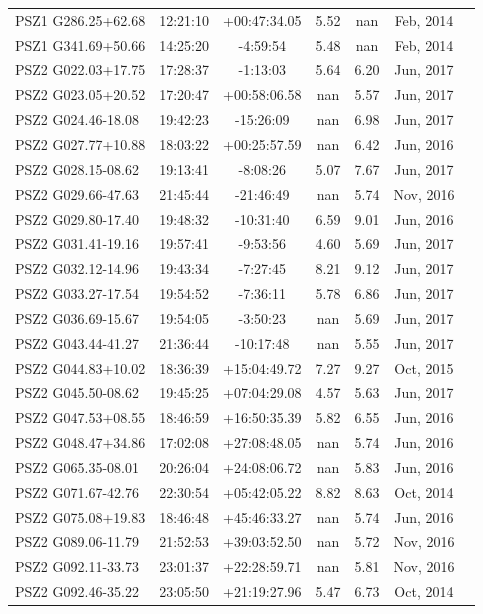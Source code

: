 \documentclass[apj, revtex4]{emulateapj}
\begin{document}
\begin{longtable*}{lcccccc}
PSZ1 G286.25+62.68 & 12:21:10 & +00:47:34.05 & 5.52 & nan & Feb, 2014\\
PSZ1 G341.69+50.66 & 14:25:20 & -4:59:54 & 5.48 & nan & Feb, 2014\\
PSZ2 G022.03+17.75 & 17:28:37 & -1:13:03 & 5.64 & 6.20 & Jun, 2017\\
PSZ2 G023.05+20.52 & 17:20:47 & +00:58:06.58 & nan & 5.57 & Jun, 2017\\
PSZ2 G024.46-18.08 & 19:42:23 & -15:26:09 & nan & 6.98 & Jun, 2017\\
PSZ2 G027.77+10.88 & 18:03:22 & +00:25:57.59 & nan & 6.42 & Jun, 2016\\
PSZ2 G028.15-08.62 & 19:13:41 & -8:08:26 & 5.07 & 7.67 & Jun, 2017\\
PSZ2 G029.66-47.63 & 21:45:44 & -21:46:49 & nan & 5.74 & Nov, 2016\\
PSZ2 G029.80-17.40 & 19:48:32 & -10:31:40 & 6.59 & 9.01 & Jun, 2016\\
PSZ2 G031.41-19.16 & 19:57:41 & -9:53:56 & 4.60 & 5.69 & Jun, 2017\\
PSZ2 G032.12-14.96 & 19:43:34 & -7:27:45 & 8.21 & 9.12 & Jun, 2017\\
PSZ2 G033.27-17.54 & 19:54:52 & -7:36:11 & 5.78 & 6.86 & Jun, 2017\\
PSZ2 G036.69-15.67 & 19:54:05 & -3:50:23 & nan & 5.69 & Jun, 2017\\
PSZ2 G043.44-41.27 & 21:36:44 & -10:17:48 & nan & 5.55 & Jun, 2017\\
PSZ2 G044.83+10.02 & 18:36:39 & +15:04:49.72 & 7.27 & 9.27 & Oct, 2015\\
PSZ2 G045.50-08.62 & 19:45:25 & +07:04:29.08 & 4.57 & 5.63 & Jun, 2017\\
PSZ2 G047.53+08.55 & 18:46:59 & +16:50:35.39 & 5.82 & 6.55 & Jun, 2016\\
PSZ2 G048.47+34.86 & 17:02:08 & +27:08:48.05 & nan & 5.74 & Jun, 2016\\
PSZ2 G065.35-08.01 & 20:26:04 & +24:08:06.72 & nan & 5.83 & Jun, 2016\\
PSZ2 G071.67-42.76 & 22:30:54 & +05:42:05.22 & 8.82 & 8.63 & Oct, 2014\\
PSZ2 G075.08+19.83 & 18:46:48 & +45:46:33.27 & nan & 5.74 & Jun, 2016\\
PSZ2 G089.06-11.79 & 21:52:53 & +39:03:52.50 & nan & 5.72 & Nov, 2016\\
PSZ2 G092.11-33.73 & 23:01:37 & +22:28:59.71 & nan & 5.81 & Nov, 2016\\
PSZ2 G092.46-35.22 & 23:05:50 & +21:19:27.96 & 5.47 & 6.73 & Oct, 2014\\

\end{longtable*}
\end{document}
